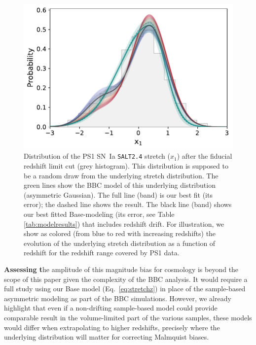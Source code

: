 \documentclass[]{aa}
\begin{document}
\begin{figure}
    \centering
    \includegraphics[width=\linewidth]{Article_figures/bbc_comp_PS1_hist-nr.pdf}
    \caption{Distribution of the PS1 SN~Ia \textsc{\texttt{SALT2.4}} stretch
        ($x_1$) after the fiducial redshift limit cut (grey histogram). This
        distribution is supposed to be a random draw from the underlying stretch
        distribution. The green lines show the BBC model of this underlying
        distribution (asymmetric Gaussian). The full line (band) is our best fit
        (its error); the dashed line shows the \cite{scolnic2018a} result. The
        black line (band) shows our best fitted Base-modeling (its error, see
        Table \ref{tab:modelresults}) that includes redshift drift. For
        illustration, we show as colored (from blue to red with increasing
        redshifts) the evolution of the underlying stretch distribution as a
        function of redshift for the redshift range covered by PS1 data.}
    \label{fig:bbc_pdf_ps1}
\end{figure}

\textbf{Assessing t}he amplitude of this magnitude bias for cosmology is beyond
the scope of this paper given the complexity of the BBC analysis. It would
require a full study using our Base model (Eq.~\ref{eq:stretchz}) in place of
the sample-based asymmetric modeling as part of the BBC simulations. However, we
already highlight that even if a non-drifting sample-based model could provide
comparable result in the volume-limited part of the various samples, these
models would differ when extrapolating to higher redshifts, precisely where the
underlying distribution will matter for correcting Malmquist biases.
\end{document}
